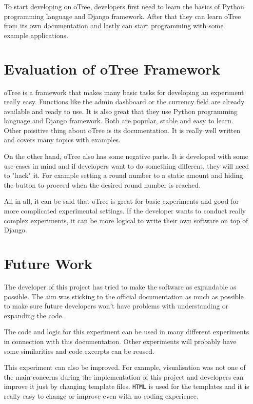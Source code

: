 To start developing on oTree, developers first need to learn the basics of Python programming language and Django framework. After that they can learn oTree from its own documentation and lastly can start programming with some example applications.

\section{Evaluation of oTree Framework}

oTree is a framework that makes many basic tasks for developing an experiment really easy. Functions like the admin dashboard or the currency field are already available and ready to use. It is also great that they use Python programming language and Django framework. Both are popular, stable and easy to learn. Other poisitive thing about oTree is its documentation. It is really well written and covers many topics with examples.

On the other hand, oTree also has some negative parts. It is developed with some use-cases in mind and if developers want to do something different, they will need to "hack" it. For example setting a round number to a static amount and hiding the button to proceed when the desired round number is reached.

All in all, it can be said that oTree is great for basic experiments and good for more complicated experimental settings. If the developer wants to conduct really complex experiments, it can be more logical to write their own software on top of Django. 

\section{Future Work}

The developer of this project has tried to make the software as expandable as possible. The aim was sticking to the official documentation as much as possible to make sure future developers won't have problems with understanding or expanding the code. 

The code and logic for this experiment can be used in many different experiments in connection with this documentation. Other experiments will probably have some similarities and code excerpts can be reused.

This experiment can also be improved. For example, visualisation was not one of the main concerns during the implementation of this project and developers can improve it just by changing template files. \verb|HTML| is used for the templates and it is really easy to change or improve even with no coding experience. 

